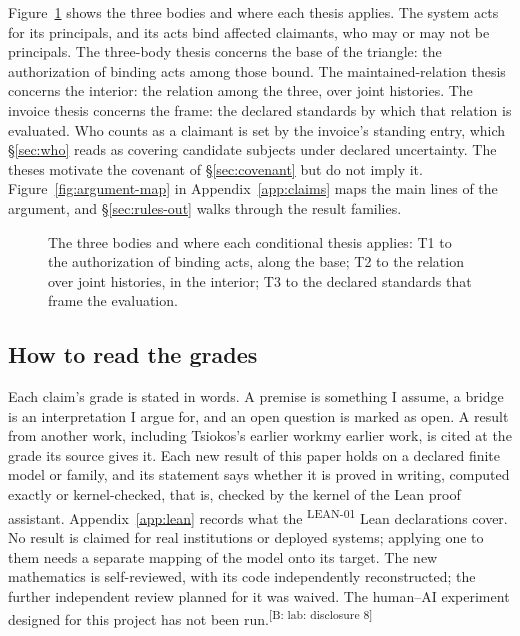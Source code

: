 \documentclass[pdflatex,sn-basic]{sn-jnl}%
\newcommand{\slot}[1]{}%
\newcommand{\claim}[2]{\ifannotated\textsuperscript{\textcolor{blue!60!black}{\tiny[#1: #2]}}\fi}
\newcommand{\rec}[1]{\ifannotated\textsuperscript{\textcolor{blue!60!black}{\tiny#1}}\fi}
\newcommand{\renderchoice}[2]{\ifanonymous#2\else#1\fi}%
\begin{document}
\slot{2.2}
Figure~\ref{fig:three-body} shows the three bodies and where each thesis applies. The system acts for its principals, and its acts bind affected claimants, who may or may not be principals. The three-body thesis concerns the base of the triangle: the authorization of binding acts among those bound. The maintained-relation thesis concerns the interior: the relation among the three, over joint histories. The invoice thesis concerns the frame: the declared standards by which that relation is evaluated. Who counts as a claimant is set by the invoice's standing entry, which \S\ref{sec:who} reads as covering candidate subjects under declared uncertainty. The theses motivate the covenant of \S\ref{sec:covenant} but do not imply it. Figure~\ref{fig:argument-map} in Appendix~\ref{app:claims} maps the main lines of the argument, and \S\ref{sec:rules-out} walks through the result families.

\begin{figure}[tbp]
  \centering
  
  \caption{The three bodies and where each conditional thesis applies: T1 to the authorization of binding acts, along the base; T2 to the relation over joint histories, in the interior; T3 to the declared standards that frame the evaluation.}
  \label{fig:three-body}
\end{figure}

\subsection{How to read the grades}\label{sec:grades}

\slot{2.3}
Each claim's grade is stated in words. A premise is something I assume, a bridge is an interpretation I argue for, and an open question is marked as open. A result from another work, including \renderchoice{my earlier work}{Tsiokos's earlier work}, is cited at the grade its source gives it. Each new result of this paper holds on a declared finite model or family, and its statement says whether it is proved in writing, computed exactly or kernel-checked, that is, checked by the kernel of the Lean proof assistant. Appendix~\ref{app:lean} records what the \numLeanDecls\rec{LEAN-01} Lean declarations cover. No result is claimed for real institutions or deployed systems; applying one to them needs a separate mapping of the model onto its target. The new mathematics is self-reviewed, with its code independently reconstructed; the further independent review planned for it was waived. The human--AI experiment designed for this project has not been run.\claim{B: lab}{disclosure 8}
\end{document}

